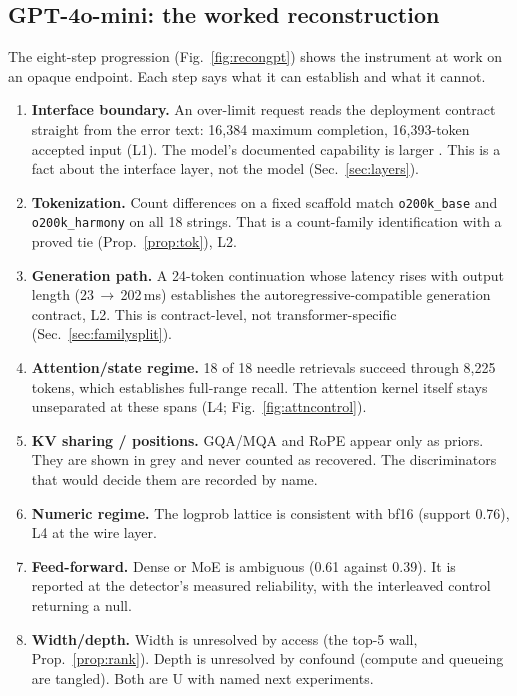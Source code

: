 \subsection{GPT-4o-mini: the worked reconstruction}
\label{sec:gptcase}
The eight-step progression (Fig.~\ref{fig:recongpt}) shows the instrument at work on an
opaque endpoint.  Each step says what it can establish and what it cannot.
\begin{enumerate}[nosep,leftmargin=1.6em,label=\textbf{\arabic*.}]
\item \textbf{Interface boundary.} An over-limit request reads the deployment contract
  straight from the error text: 16{,}384 maximum completion, 16{,}393-token accepted
  input (L1).  The model's documented capability is larger \cite{openaimini2024docs}.
  This is a fact about the interface layer, not the model (Sec.~\ref{sec:layers}).
\item \textbf{Tokenization.} Count differences on a fixed scaffold match
  \texttt{o200k\_base} and \texttt{o200k\_harmony} on all 18 strings.  That is a
  count-family identification with a proved tie (Prop.~\ref{prop:tok}), L2.
\item \textbf{Generation path.} A 24-token continuation whose latency rises with output
  length (23\,$\to$\,202\,ms) establishes the autoregressive-compatible generation
  contract, L2.  This is contract-level, not transformer-specific
  (Sec.~\ref{sec:familysplit}).
\item \textbf{Attention/state regime.} 18 of 18 needle retrievals succeed through 8{,}225
  tokens, which establishes full-range recall.  The attention kernel itself stays
  unseparated at these spans (L4; Fig.~\ref{fig:attncontrol}).
\item \textbf{KV sharing / positions.} GQA/MQA and RoPE appear only as priors.  They
  are shown in grey and never counted as recovered.  The discriminators that would decide
  them are recorded by name.
\item \textbf{Numeric regime.} The logprob lattice is consistent with bf16 (support 0.76),
  L4 at the wire layer.
\item \textbf{Feed-forward.} Dense or MoE is ambiguous (0.61 against 0.39).  It is reported
  at the detector's measured \MoeAcc{} reliability, with the interleaved control
  returning a null.
\item \textbf{Width/depth.} Width is unresolved by access (the top-5 wall,
  Prop.~\ref{prop:rank}).  Depth is unresolved by confound (compute and queueing are
  tangled).  Both are U with named next experiments.
\end{enumerate}

